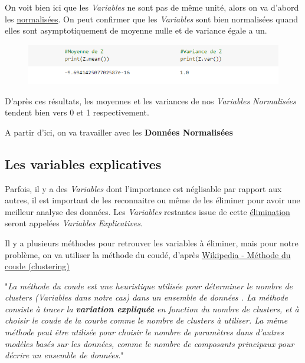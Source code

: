 \documentclass{article}
\begin{document}
On voit bien ici que les \textit{Variables} ne sont pas de même unité, alors on va d'abord les \underline{normalisées}. On peut confirmer que les \textit{Variables} sont bien normalisées quand elles sont asymptotiquement de moyenne nulle et de variance égale a un.

\begin{figure}[h!]
\includegraphics[width=\linewidth]{images/mean_variance.png}
\end{figure}

D'après ces résultats, les moyennes et les variances de nos \textit{Variables Normalisées} tendent bien vers 0 et 1 respectivement.
\newline

A partir d'ici, on va travailler avec les \textbf{Données Normalisées} 

\newpage

\subsection{Les variables explicatives}

Parfois, il y a des \textit{Variables} dont l'importance est néglisable par rapport aux autres, il est important de les reconnaitre ou même de les éliminer pour avoir une meilleur analyse des données. Les \textit{Variables} restantes issue de cette \underline{élimination} seront appelées \textit{Variables Explicatives}.
\newline

Il y a plusieurs méthodes pour retrouver les variables à éliminer, mais pour notre problème, on va utiliser la méthode du coudé, d'après \href{https://fr.qaz.wiki/wiki/Elbow_method_(clustering)}{Wikipedia - Méthode du coude (clustering)} 
\newline

"\textit{La méthode du coude est une heuristique utilisée pour déterminer le nombre de clusters (Variables dans notre cas) dans un ensemble de données . La méthode consiste à tracer la \textbf{variation expliquée} en fonction du nombre de clusters, et à choisir le coude de la courbe comme le nombre de clusters à utiliser. La même méthode peut être utilisée pour choisir le nombre de paramètres dans d'autres modèles basés sur les données, comme le nombre de composants principaux pour décrire un ensemble de données}."
\newline
\end{document}
